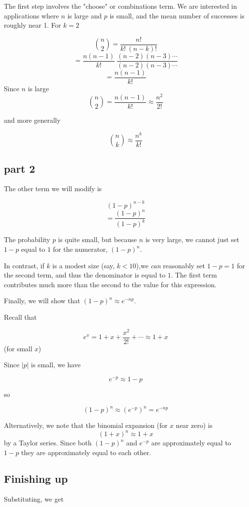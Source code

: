 \documentclass[11pt, oneside]{article}
\begin{document}
The first step involves the "choose" or combinations term. We are interested in applications where $n$ is large and $p$ is small, and the mean number of successes is roughly near 1.  For $k=2$

\[ {n\choose 2} =  \frac{n!}{k!  \ (n-k)!}  \]
\[ = \frac{ n (n-1)}{k!} \ \frac{(n-2) (n-3) \cdots}{(n-2) (n-3) \cdots} \]
\[ = \frac{ n (n-1) }{ k! } \]
Since $n$ is large
\[  {n\choose 2} = \frac{ n (n-1) }{ k! } \approx \frac{n^2}{2!} \]

and more generally

\[ {n\choose k} \approx \frac{n^k}{k!}  \]

\subsection*{part 2}

The other term we will modify is

\[ (1-p)^{n-k} \]
\[ = \frac{(1-p)^n}{(1-p)^{k}} \]

The probability $p$ is quite small, but because $n$ is very large, we cannot just set $1-p$ equal to $1$ for the numerator, $(1-p)^n$.

In contrast, if $k$ is a modest size (say, $k < 10$),we \emph{can} reasonably set $1-p = 1$ for the second term, and thus the denominator is equal to $1$. The first term contributes much more than the second to the value for this expression.

Finally, we will show that $(1-p)^n \approx e^{-np}$.

Recall that

\[ e^x = 1 + x + \frac{x^2}{2!} + \cdots \approx 1 + x \]
(for small $x$)

Since $|p|$ is small, we have

\[ e^{-p} \approx 1 - p \]

so

\[ (1-p)^n \approx (e^{-p})^n = e^{-np} \]

Alternatively, we note that the binomial expansion (for $x$ near zero) is 
\[ (1 + x)^n \approx 1 + x \]
by a Taylor series.  Since both $(1-p)^n$ and $e^{-p}$ are approximately equal to $1-p$ they are approximately equal to each other.

\subsection*{Finishing up}

Substituting, we get
\end{document}
